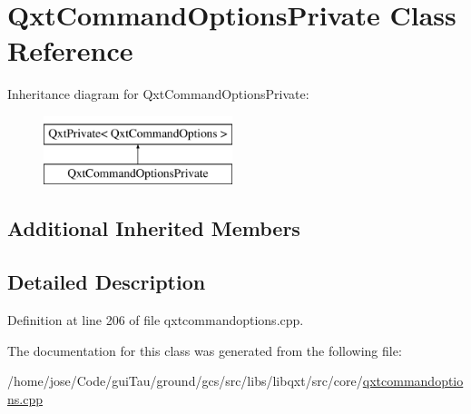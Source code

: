 \hypertarget{class_qxt_command_options_private}{\section{Qxt\-Command\-Options\-Private Class Reference}
\label{class_qxt_command_options_private}
}
Inheritance diagram for Qxt\-Command\-Options\-Private\-:\begin{figure}[H]
\begin{center}
\leavevmode
\includegraphics[height=2.000000cm]{class_qxt_command_options_private}
\end{center}
\end{figure}
\subsection*{Additional Inherited Members}


\subsection{Detailed Description}


Definition at line 206 of file qxtcommandoptions.\-cpp.



The documentation for this class was generated from the following file\-:\begin{DoxyCompactItemize}
\item 
/home/jose/\-Code/gui\-Tau/ground/gcs/src/libs/libqxt/src/core/\hyperlink{qxtcommandoptions_8cpp}{qxtcommandoptions.\-cpp}\end{DoxyCompactItemize}
